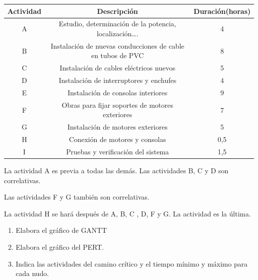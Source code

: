 \documentclass[../main]{subfiles}
\begin{document}
\begin{enumerate}
\begin{table}[h!]
    \centering
    \begin{tabular}{|c|c|c|} \hline
Actividad & Descripción & Duración(horas) \\ \hline \hline
A & Estudio, determinación de la potencia, localización….& 4\\
B &Instalación de nuevas conducciones de cable en tubos de PVC& 8\\
C &Instalación de cables eléctricos nuevos& 5\\
D &Instalación de interruptores y enchufes& 4\\
E &Instalación de consolas interiores& 9\\
F &Obras para fijar soportes de motores exteriores &7\\
G &Instalación de motores exteriores &5\\
H &Conexión de motores y consolas & 0,5\\
I &Pruebas y verificación del sistema & 1,5\\ \hline
    \end{tabular}
    \label{tab:my_label}
\end{table}

La actividad A es previa a todas las demás. Las actividades B, C y D son correlativas.


Las actividades F y G también son correlativas.

La actividad H se hará después de A, B, C , D, F y G. La actividad es la última.
\begin{enumerate}
   \item Elabora el gráfico de GANTT
\item Elabora el gráfico del PERT.\item Indica las actividades del camino crítico y el tiempo mínimo y máximo para cada nudo. 

\end{enumerate}


\end{enumerate}
\end{document}

